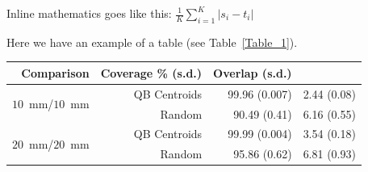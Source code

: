 \documentclass{bioinfo}
\begin{document}
Inline mathematics goes like this: $\frac{1}{K}\sum_{i=1}^{K}|s_{i}-t_{i}|$

Here we have an example of a table (see Table~\ref{Table_1}).

\begin{table}[th]  {\begin{tabular}{rrrr} %
Comparison & Coverage \% (s.d.) & Overlap (s.d.) \\ \hline
\multirow{2}{*}{$10$~mm/$10$~mm} & QB Centroids & 99.96 (0.007) & 2.44
(0.08)\\ & Random & 90.49 (0.41) & 6.16 (0.55)\\ \hline
\multirow{2}{*}{$20$~mm/$20$~mm} & QB Centroids & 99.99 (0.004) & 3.54
(0.18)\\ & Random & 95.86 (0.62) & 6.81 (0.93)\\ \hline
\end{tabular}}{}
\end{table}



%
%
%
%

\end{document}
